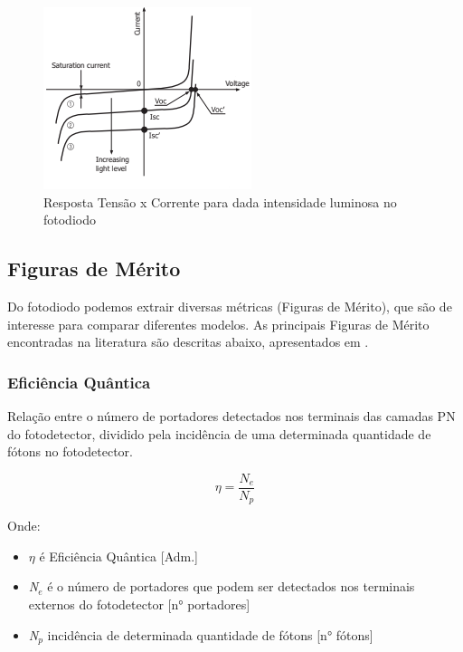 \begin{figure}[htb]
	\caption{\label{fig_respFotodiodo}Resposta Tens\~ao x Corrente para dada intensidade luminosa no fotodiodo}
	\begin{center}
	    \includegraphics[scale=0.8]{Imagens/graficoRespostaFotodiodo.png}
	\end{center}
\end{figure}

\subsection{Figuras de M\'erito}
Do fotodiodo podemos extrair diversas m\'etricas (Figuras de M\'erito), que são de interesse para comparar diferentes modelos. As principais Figuras de M\'erito encontradas na literatura são descritas abaixo, apresentados em \cite{LidianeCampos}.

\subsubsection{Eficiência Quântica}
Relação entre o número de portadores detectados nos terminais das camadas PN do fotodetector, dividido pela incidência de uma determinada quantidade de fótons no fotodetector.

\begin{equation}
    \eta = \frac{N_e}{N_p}
\end{equation}

Onde:
\begin{itemize}
    \item \emph{$\eta$} \'e Efici\^encia Qu\^antica [Adm.]
    \item \emph{N$_e$} \'e o n\'umero de portadores que podem ser detectados nos terminais externos do fotodetector [n° portadores]
    \item \emph{N$_p$} incid\^encia de determinada quantidade de f\'otons [n° f\'otons]
\end{itemize}

